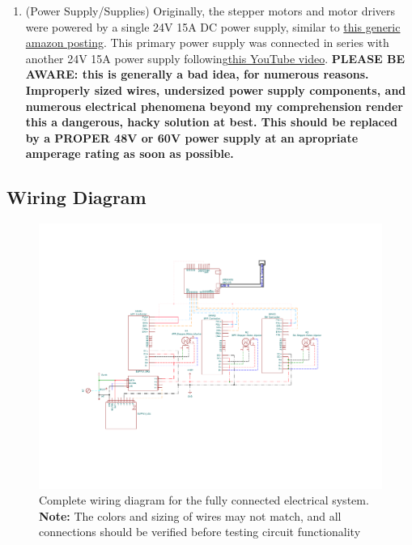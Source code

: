 \documentclass{article}
\begin{document}
\begin{enumerate}
\item(Power Supply/Supplies) Originally, the stepper motors and motor drivers were powered by a single 24V 15A DC power supply, similar to \href{https://www.amazon.com/Switching-SJHPRMXF-Universal-Regulated-Transformer/dp/B0BWC8J2HY/ref=sr_1_4?crid=2KFHB4ZPW918C&dib=eyJ2IjoiMSJ9.FPK3xtReWIHdljtMiM5tJdXhBQ5q_-IO-pflt5CI00iFDB9iYGMc79Ty_FO0dvSjdtl0D0Zih9khd_51xjQamVo7iaApGN1fatpqVmezqN7-BDClRtcv_gsEr8ofznzE0bb5uG-HI-YOc7R0-aT_jQXBuObvvQguQbhkOHwR9Rz7JSEfk6LCDIEusBev-jj4meyV8GGQBtdx2AE4DfrnhkPKcfrdVDSSCgHEC-I6Ccjzjrr8_a77e0xSFJ9ziQedmuPHjgInys8orLajkbVt0rwaIr624xeHIuU9LhTWBNQ.29UMZP6yEU8jGo2FBFcXFL1GxivPtxQHOTDhLT26qvg&}{this generic amazon posting}. This primary power supply was connected in series with another 24V 15A power supply following\href{https://www.youtube.com/watch?v=jbzb66dCbOc}{this YouTube video}. \textbf{PLEASE BE AWARE: this is generally a bad idea, for numerous reasons. Improperly sized wires, undersized power supply components, and numerous electrical phenomena beyond my comprehension render this a dangerous, hacky solution at best. This should be replaced by a PROPER 48V or 60V power supply at an apropriate amperage rating as soon as possible.}

\end{enumerate}
\newpage
\subsection{Wiring Diagram}
\begin{figure}[h]
\centering
\includegraphics[width=\textwidth, trim=3.5cm 4.5cm 5.0cm 2.5cm, clip,scale=1.5]{Print Schematic_R7.pdf}
\caption{Complete wiring diagram for the fully connected electrical system. \textbf{Note:} The colors and sizing of wires may not match, and all connections should be verified before testing circuit functionality}
\end{figure}
\end{document}

